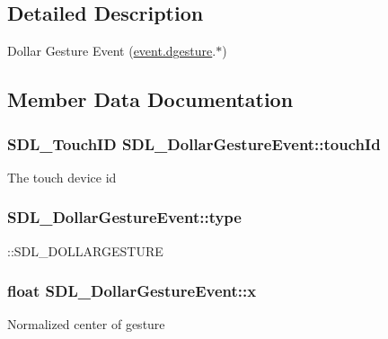 \subsection{Detailed Description}
Dollar Gesture Event (\hyperlink{unionSDL__Event_a4481167b9f8549aeb254e97ca812e74d}{event.\+dgesture}.$\ast$) 

\subsection{Member Data Documentation}
\hypertarget{structSDL__DollarGestureEvent_a40402f6911ed0dba48e6b23aa02bd83d}{}
\subsubsection[{touch\+Id}]{\setlength{\rightskip}{0pt plus 5cm}S\+D\+L\+\_\+\+Touch\+I\+D S\+D\+L\+\_\+\+Dollar\+Gesture\+Event\+::touch\+Id}\label{structSDL__DollarGestureEvent_a40402f6911ed0dba48e6b23aa02bd83d}
The touch device id \hypertarget{structSDL__DollarGestureEvent_ac7f6948754a1b2eb36edde043bf75ce9}{}
\subsubsection[{type}]{ S\+D\+L\+\_\+\+Dollar\+Gesture\+Event\+::type}\label{structSDL__DollarGestureEvent_ac7f6948754a1b2eb36edde043bf75ce9}
\+::\+S\+D\+L\+\_\+\+D\+O\+L\+L\+A\+R\+G\+E\+S\+T\+U\+R\+E \hypertarget{structSDL__DollarGestureEvent_a9888449bd8842ed96494b4db16a6097b}{}
\subsubsection[{x}]{\setlength{\rightskip}{0pt plus 5cm}float S\+D\+L\+\_\+\+Dollar\+Gesture\+Event\+::x}\label{structSDL__DollarGestureEvent_a9888449bd8842ed96494b4db16a6097b}
Normalized center of gesture \hypertarget{structSDL__DollarGestureEvent_a293b2303acc1cfc63c167c5525e6eab5}{}
